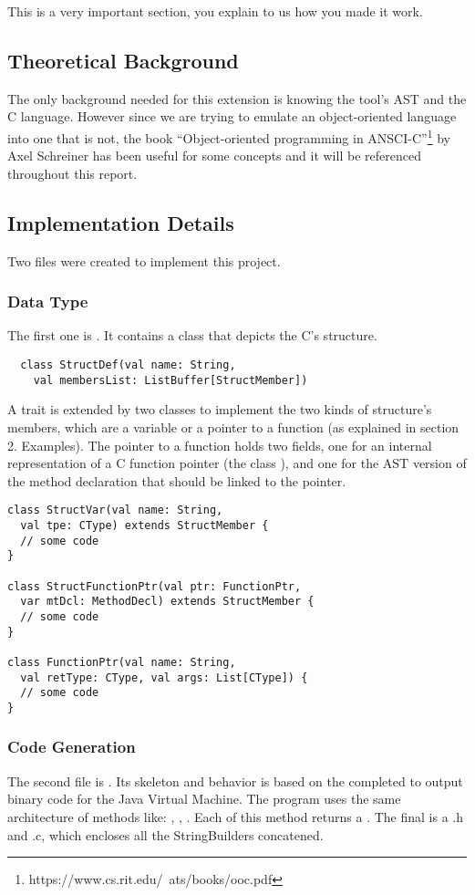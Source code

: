 This is a very important section, you explain to us how you made it work.

\subsection{Theoretical Background}
The only background needed for this extension is knowing the tool's AST and the C language.
However since we are trying to emulate an object-oriented language into one that is not,
the book ``Object-oriented programming in ANSCI-C''\footnote{https://www.cs.rit.edu/~ats/books/ooc.pdf}
by Axel Schreiner has been useful for some concepts and it will be referenced throughout this report.

\subsection{Implementation Details}
Two files were created to implement this project.
\subsubsection{Data Type}
The first one is . It contains a class that depicts the C's structure.
\lstset{style=customscala}
\begin{lstlisting}
  class StructDef(val name: String,
    val membersList: ListBuffer[StructMember])
\end{lstlisting}
 A trait  is extended by two classes to implement the two kinds of structure's members,
 which are a variable or a pointer to a function (as explained in section 2. Examples).
 The pointer to a function holds two fields, one for an internal representation of a C function pointer (the class ),
 and one for the AST version of the method declaration that should be linked to the pointer.

 \begin{lstlisting}
class StructVar(val name: String,
  val tpe: CType) extends StructMember {
  // some code
}

class StructFunctionPtr(val ptr: FunctionPtr,
  var mtDcl: MethodDecl) extends StructMember {
  // some code
}

class FunctionPtr(val name: String,
  val retType: CType, val args: List[CType]) {
  // some code
}
 \end{lstlisting}
 \subsubsection{Code Generation}
The second file is . Its skeleton and behavior is based on the  completed
to output binary code for the Java Virtual Machine.
The program uses the same architecture of methods like: , , .
Each of this method returns a \lstset{style=customc}{\lstinline[basicstyle=\small\ttfamily]|StringBuilder|}.
\newline
The final is a .h and .c, which encloses all the StringBuilders concatened.
\newline
